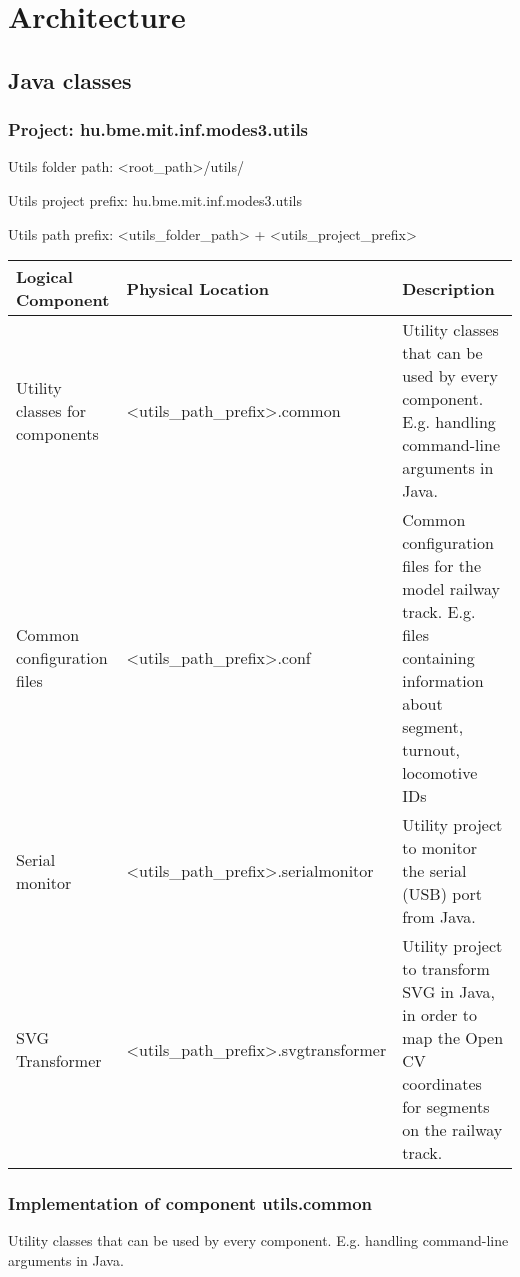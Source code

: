 
\chapter{Architecture}


\section{Java classes}
\subsection{Project: hu.bme.mit.inf.modes3.utils}

Utils folder path: <root\_path>/utils/

Utils project prefix: hu.bme.mit.inf.modes3.utils

Utils path prefix: <utils\_folder\_path> + <utils\_project\_prefix>
\begin{center}
	\begin{tabular}{ | m{3 cm } | m{ 6 cm} | m{5cm} | }
		\hline
		Logical Component & Physical Location & Description \\ \hline
		Utility classes for components & <utils\_path\_prefix>.common & Utility classes that can be used by every component. E.g. handling command-line arguments in Java.\\ \hline
		Common configuration files & <utils\_path\_prefix>.conf & 
		Common configuration files for the model railway track. E.g. files containing information about segment, turnout, locomotive IDs\\ \hline
		Serial monitor & <utils\_path\_prefix>.serialmonitor &
		Utility project to monitor the serial (USB) port from Java. \\ \hline	
		SVG Transformer & <utils\_path\_prefix>.svgtransformer &
		Utility project to transform SVG in Java, in order to map the Open CV coordinates for segments on the railway track. \\ \hline
	\end{tabular}
\end{center}

\subsection{Implementation of component utils.common}
Utility classes that can be used by every component. E.g. handling command-line arguments in Java.

